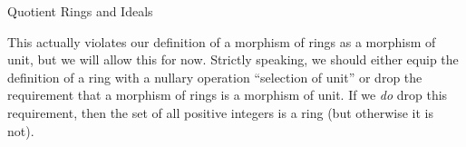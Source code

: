 \begin{section}{Quotient Rings and Ideals}
\begin{danger}
This actually violates our definition of a morphism of rings as a morphism of unit, but we will allow this for now. Strictly speaking, we should either equip the definition of a ring with a nullary operation ``selection of unit'' or drop the requirement that a morphism of rings is a morphism of unit. If we {\em do} drop this requirement, then the set of all positive integers is a ring (but otherwise it is not).
\end{danger}

\end{section}